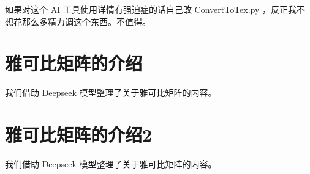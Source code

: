 \documentclass{MMCStyle}
\begin{document}
如果对这个 AI 工具使用详情有强迫症的话自己改 ConvertToTex.py ，反正我不想花那么多精力调这个东西。不值得。

\section{雅可比矩阵的介绍}

我们借助 Deepseek \cite{deepseek} 模型整理了关于雅可比矩阵的内容。

\begin{dialog}[介绍一下雅可比矩阵][false]

\end{dialog}

\section{雅可比矩阵的介绍2}

我们借助 Deepseek \cite{deepseek} 模型整理了关于雅可比矩阵的内容。

\begin{dialog}[介绍一下雅可比矩阵][true]

\end{dialog}

\clearpage
{}
{}
% 
\printbibliography[title={参考文献}] %
\end{document}
